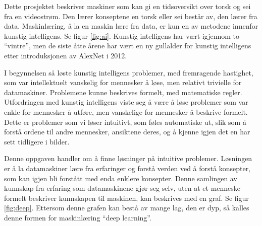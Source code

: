 Dette prosjektet beskriver maskiner som kan gi en tidsoversikt over torsk og sei fra en videostrøm. Den lærer konseptene en torsk eller sei består av, den lærer fra data. Maskinlæring, å la en maskin lære fra data, er kun en av metodene innenfor kunstig intelligens. Se figur \ref{fig:ai}. Kunstig intelligens har vært igjennom to ``vintre'', men de siste åtte årene har vært en ny gullalder for kunstig intelligens etter introduksjonen av AlexNet i 2012. \cite{Canziani m.fl. 2017 s. 1}

I begynnelsen så løste kunstig intelligens problemer, med fremragende hastighet, som var intellektuelt vanskelig for mennesker å løse, men relativt trivielle for datamaskiner. Problemene kunne beskrives formelt, med matematiske regler. Utfordringen med kunstig intelligens viste seg å være å løse problemer som var enkle for mennesker å utføre, men vanskelige for mennesker å beskrive formelt. Dette er problemer som vi løser intuitivt, som føles automatiske ut, slik som å forstå ordene til andre mennesker, ansiktene deres, og å kjenne igjen det en har sett tidligere i bilder. \cite{Goodfellow m.fl. 2016 s. 1}

Denne oppgaven handler om å finne løsninger på intuitive problemer. Løsningen er å la datamaskiner lære fra erfaringer og forstå verden ved å forstå konsepter, som kan igjen bli forstått med enda enklere konsepter. Denne samlingen av kunnskap fra erfaring som datamaskinene gjør seg selv, uten at et menneske formelt beskriver kunnskapen til maskinen, kan beskrives med en graf. Se figur \ref{fig:deep}. Ettersom denne grafen kan bestå av mange lag, den er dyp, så kalles denne formen for maskinlæring ``deep learning''. \cite{Goodfellow m.fl. 2016 s. 1}


